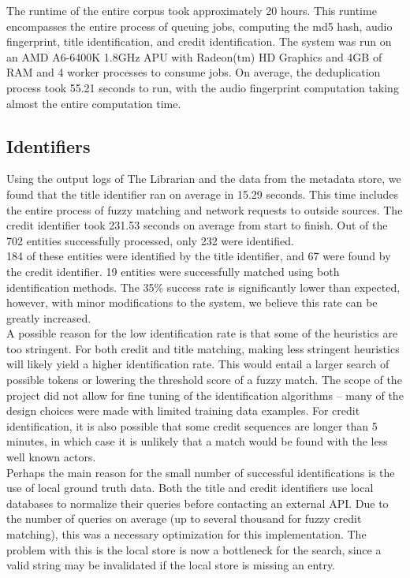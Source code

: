 \documentclass[paper=a4, fontsize=11pt]{scrartcl} %
\numberwithin{equation}{section} %
\numberwithin{figure}{section} %
\numberwithin{table}{section} %
\begin{document}
The runtime of the entire corpus took approximately 20 hours. This runtime encompasses the entire process of queuing jobs, computing the md5 hash, audio fingerprint, title identification, and credit identification. The system was run on an AMD A6-6400K 1.8GHz APU with Radeon(tm) HD Graphics and 4GB of RAM and 4 worker processes to consume jobs. On average, the deduplication process took 55.21 seconds to run, with the audio fingerprint computation taking almost the entire computation time. \\

\subsection{Identifiers}
\label{sec:identifiers-performance}
Using the output logs of The Librarian and the data from the metadata store, we found that the title identifier ran on average in 15.29 seconds. This time includes the entire process of fuzzy matching and network requests to outside sources. The credit identifier took 231.53 seconds on average from start to finish. Out of the 702 entities successfully processed, only 232 were identified. \\

184 of these entities were identified by the title identifier, and 67 were found by the credit identifier. 19 entities were successfully matched using both identification methods. The 35\% success rate is significantly lower than expected, however, with minor modifications to the system, we believe this rate can be greatly increased. \\

A possible reason for the low identification rate is that some of the heuristics are too stringent. For both credit and title matching, making less stringent heuristics will likely yield a higher identification rate. This would entail a larger search of possible tokens or lowering the threshold score of a fuzzy match. The scope of the project did not allow for fine tuning of the identification algorithms -- many of the design choices were made with limited training data examples. For credit identification, it is also possible that some credit sequences are longer than 5 minutes, in which case it is unlikely that a match would be found with the less well known actors. \\

Perhaps the main reason for the small number of successful identifications is the use of local ground truth data. Both the title and credit identifiers use local databases to normalize their queries before contacting an external API. Due to the number of queries on average (up to several thousand for fuzzy credit matching), this was a necessary optimization for this implementation. The problem with this is the local store is now a bottleneck for the search, since a valid string may be invalidated if the local store is missing an entry. \\
\end{document}
